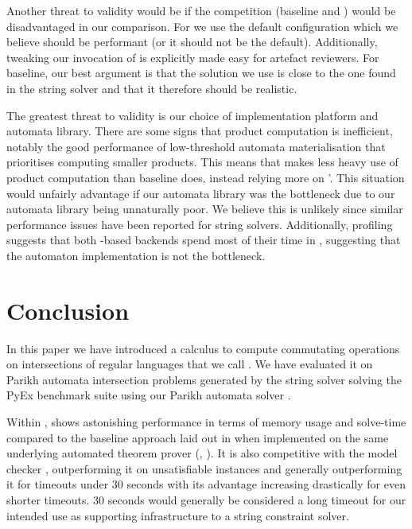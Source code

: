 \documentclass[acmsmall,review,anonymous,screen]{acmart}\settopmatter{printfolios=true,printccs=true,printacmref=true}
\theoremstyle{definition}
\begin{document}
Another threat to validity would be if the competition (baseline and \Nuxmv)
would be disadvantaged in our comparison. For \Nuxmv{} we use the default
configuration which we believe should be performant (or it should not be the
default). Additionally, tweaking our invocation of \Nuxmv{} is explicitly made
easy for artefact reviewers. For baseline, our best argument is that the
solution we use is close to the one found in the \Ostrich{} string solver and
that it therefore should be realistic.

The greatest threat to validity is our choice of implementation platform and
automata library. There are some signs that product computation is inefficient,
notably the good performance of low-threshold automata materialisation that
prioritises computing smaller products. This means that \Calculus{} makes less
heavy use of product computation than baseline does, instead relying more on
\Princess{}'. This situation would unfairly advantage \Calculus{} if our
automata library was the bottleneck due to our automata library being
unnaturally poor. We believe this is unlikely since similar performance issues
have been reported for string solvers. Additionally, profiling suggests that
both \Princess{}-based backends spend most of their time in \Princess{},
suggesting that the automaton implementation is not the bottleneck.

\section{Conclusion}

In this paper we have introduced a calculus to compute commutating operations on
intersections of regular languages that we call \Calculus{}. We have evaluated
it on \NrBenchmarks{} Parikh automata intersection problems generated by the
\OstrichPlus{} string solver \cite{ostrich-plus} solving the PyEx benchmark
suite \cite{pyex} using our Parikh automata solver \Catra{}.

Within \Catra{}, \Calculus{} shows astonishing performance in terms of memory
usage and solve-time compared to the baseline approach laid out in
\cite{generate-parikh-image} when implemented on the same underlying automated
theorem prover (\Princess{}, \cite{princess}). It is also competitive with the
\Nuxmv{} model checker \cite{nuxmv}, outperforming it on unsatisfiable instances
and generally outperforming it for timeouts under 30 seconds with its advantage
increasing drastically for even shorter timeouts. 30 seconds would generally be
considered a long timeout for our intended use as supporting infrastructure to a
string constraint solver.
\end{document}
